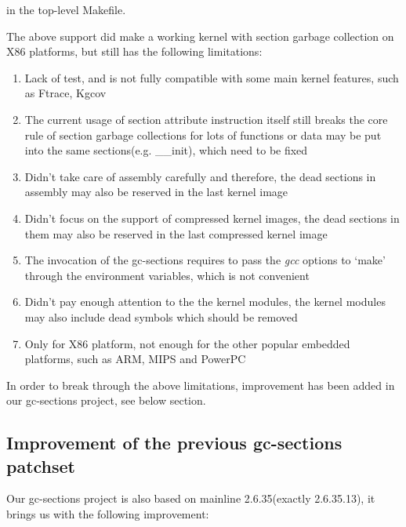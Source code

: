\documentclass[10pt,a4paper]{article}
\begin{document}
\begin{multicols}{2}
\begin{itemize}
in the top-level Makefile.

\end{itemize}

The above support did make a working kernel with section garbage collection on
X86 platforms, but still has the following limitations:

\begin{enumerate}

\item Lack of test, and is not fully compatible with some main kernel features,
such as Ftrace, Kgcov

\item The current usage of section attribute instruction itself still breaks
the core rule of section garbage collections for lots of functions or data may
be put into the same sections(e.g. \_\_init), which need to be fixed

\item Didn't take care of assembly carefully and therefore, the dead sections
in assembly may also be reserved in the last kernel image

\item Didn't focus on the support of compressed kernel images, the dead
sections in them may also be reserved in the last compressed kernel image

\item The invocation of the gc-sections requires to pass the {\em gcc} options to
`make' through the environment variables, which is not convenient

\item Didn't pay enough attention to the the kernel modules, the kernel modules
may also include dead symbols which should be removed

\item Only for X86 platform, not enough for the other popular embedded
platforms, such as ARM, MIPS and PowerPC

\end{enumerate}

In order to break through the above limitations, improvement has been added in
our gc-sections project, see below section.

\subsection{Improvement of the previous gc-sections patchset}

Our gc-sections project is also based on mainline 2.6.35(exactly 2.6.35.13),
it brings us with the following improvement:


\end{multicols}
\end{document}
